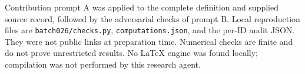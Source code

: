 \documentclass[11pt]{article}
\begin{document}
Contribution prompt A was applied to the complete definition and supplied source record, followed by the adversarial checks of prompt B. Local reproduction files are \texttt{batch026/checks.py}, \texttt{computations.json}, and the per-ID audit JSON. They were not public links at preparation time. Numerical checks are finite and do not prove unrestricted results. No LaTeX engine was found locally; compilation was not performed by this research agent.
\end{document}
